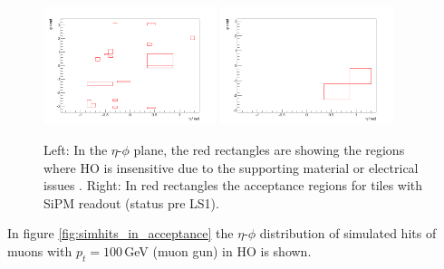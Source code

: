 			\begin{figure}[htbp]
				\centering
				\includegraphics[width=0.45\textwidth]{Figures/erdogan/deadregions.png}
				\includegraphics[width=0.45\textwidth]{Figures/erdogan/sipmregions.png}
				\caption{Left: In the $\eta$-$\phi$ plane, the red rectangles are showing the regions where HO is insensitive due to the supporting material or electrical issues \cite{JINST}. Right: In red
				rectangles the acceptance regions for tiles with SiPM readout (status pre LS1).}
				\label{fig:ho_acceptance}
			\end{figure}
			In figure \ref{fig:simhits_in_acceptance} the $\eta$-$\phi$ distribution of simulated hits of muons with $p_t = 100$\,GeV (muon gun) in HO is shown.
